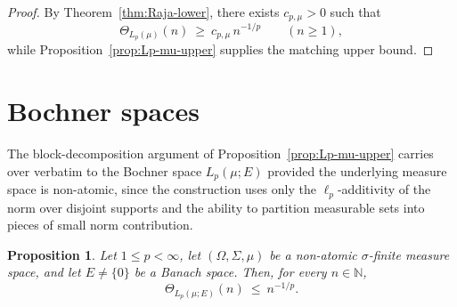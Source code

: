 \documentclass[reqno,11pt]{amsart}
\theoremstyle{plain}
\newtheorem{proposition}[theorem]{Proposition}
\theoremstyle{definition}
\theoremstyle{remark}
\renewcommand{\le}{\leqslant}
\renewcommand{\ge}{\geqslant}
\begin{document}
\begin{proof}
By Theorem~\ref{thm:Raja-lower}, there exists $c_{p,\mu}>0$ such that
\[
\Theta_{L_p(\mu)}(n)\ \ge\ c_{p,\mu}\,n^{-1/p}
\qquad(n\ge1),
\]
while Proposition~\ref{prop:Lp-mu-upper} supplies the matching upper bound.
\end{proof}

\section{Bochner spaces}\label{sec:Bochner}

The block-decomposition argument of Proposition~\ref{prop:Lp-mu-upper} carries
over verbatim to the Bochner space $L_p(\mu;E)$ provided the underlying
measure space is non-atomic, since the construction uses only the
$\ell_p$-additivity of the norm over disjoint supports and the ability to
partition measurable sets into pieces of small norm contribution.

\begin{proposition}\label{prop:Bochner-upper}
Let $1\le p<\infty$, let $(\Omega,\Sigma,\mu)$ be a non-atomic $\sigma$-finite
measure space, and let $E\neq\{0\}$ be a Banach space.  Then, for every
$n\in\mathbb{N}$,
\[
\Theta_{L_p(\mu;E)}(n)\ \le\ n^{-1/p}.
\]
\end{proposition}
\end{document}
